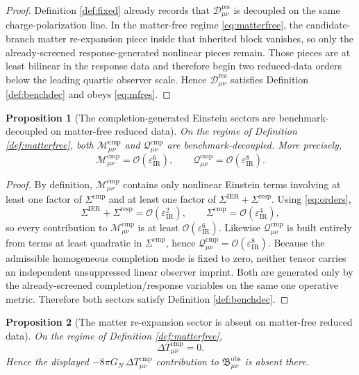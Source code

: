 \documentclass[11pt]{article}
\newcommand{\BaseShift}{\Sigma^{\mathrm{IER}}}
\newcommand{\ResponseShift}{\Sigma^{\mathrm{resp}}}
\newcommand{\CompShift}{\Sigma^{\mathrm{cmp}}}
\newcommand{\ResidualDec}{\mathcal D_{\mu\nu}^{\mathrm{res}}}
\newcommand{\CompMix}{\mathcal M_{\mu\nu}^{\mathrm{cmp}}}
\newcommand{\CompQuad}{\mathcal Q_{\mu\nu}^{\mathrm{cmp}}}
\newcommand{\DeltaTComp}{\Delta T_{\mu\nu}^{\mathrm{cmp}}}
\newcommand{\ObsBurden}{\mathfrak B_{\mu\nu}^{\mathrm{obs}}}
\newcommand{\epsIR}{\varepsilon_{\mathrm{IR}}}
\newtheorem{proposition}{Proposition}
\begin{document}
\begin{proof}
Definition \ref{def:fixed} already records that \(\ResidualDec\) is decoupled on the same charge-polarization line. In the matter-free regime \eqref{eq:matterfree}, the candidate-branch matter re-expansion piece inside that inherited block vanishes, so only the already-screened response-generated nonlinear pieces remain. Those pieces are at least bilinear in the response data and therefore begin two reduced-data orders below the leading quartic observer scale. Hence \(\ResidualDec\) satisfies Definition \ref{def:benchdec} and obeys \eqref{eq:mfres}.
\end{proof}

\begin{proposition}[The completion-generated Einstein sectors are benchmark-decoupled on matter-free reduced data]
\label{prop:mfcomp}
On the regime of Definition \ref{def:matterfree}, both \(\CompMix\) and \(\CompQuad\) are benchmark-decoupled. More precisely,
\begin{equation}
\CompMix=\mathcal O(\epsIR^6),
\qquad
\CompQuad=\mathcal O(\epsIR^8).
\label{eq:mfcomp}
\end{equation}
\end{proposition}

\begin{proof}
By definition, \(\CompMix\) contains only nonlinear Einstein terms involving at least one factor of \(\CompShift\) and at least one factor of \(\BaseShift+\ResponseShift\). Using \eqref{eq:orders},
\[
\BaseShift+\ResponseShift=\mathcal O(\epsIR^2),
\qquad
\CompShift=\mathcal O(\epsIR^4),
\]
so every contribution to \(\CompMix\) is at least \(\mathcal O(\epsIR^6)\). Likewise \(\CompQuad\) is built entirely from terms at least quadratic in \(\CompShift\), hence \(\CompQuad=\mathcal O(\epsIR^8)\). Because the admissible homogeneous completion mode is fixed to zero, neither tensor carries an independent unsuppressed linear observer imprint. Both are generated only by the already-screened completion/response variables on the same one operative metric. Therefore both sectors satisfy Definition \ref{def:benchdec}.
\end{proof}

\begin{proposition}[The matter re-expansion sector is absent on matter-free reduced data]
\label{prop:mfmatter}
On the regime of Definition \ref{def:matterfree},
\begin{equation}
\DeltaTComp=0.
\label{eq:mfmatter}
\end{equation}
Hence the displayed \(-8\pi G_N\,\DeltaTComp\) contribution to \(\ObsBurden\) is absent there.
\end{proposition}
\end{document}
